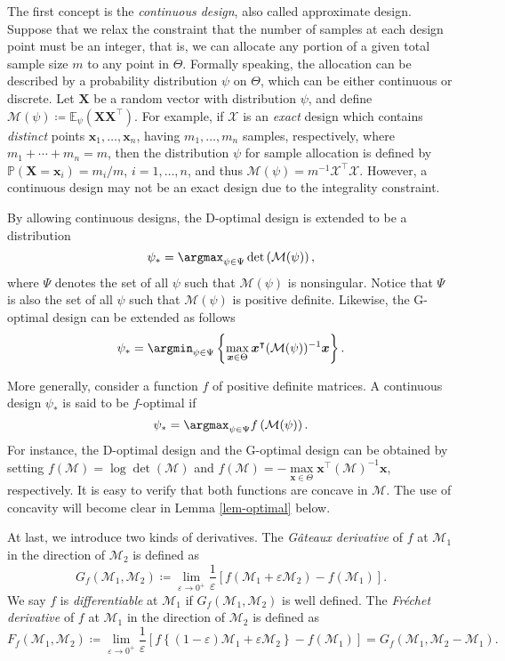 \documentclass[ijoc,nonblindrev]{informs3}
\def\E{\mathbb{E}}
\def\pr{\mathbb{P}}
\def\bx{{\bm x}}
\def\bX{{\bm X}}
\def\cX{{\mathcal X}}
\def\cM{{\mathcal M}}
\begin{document}
The first concept is the \emph{continuous design}, also called approximate design.
Suppose that we relax the constraint that the number of samples at each design point must be an integer, that is, we can allocate any portion of a given total sample size $m$  to any point in $\Theta$.
Formally speaking, the allocation can be described by a probability distribution $\psi$ on $\Theta$, which can be either continuous or discrete.
Let $\bX$ be a random vector with distribution $\psi$, and define $\cM(\psi) \coloneqq \E_\psi(\bX \bX^\intercal)$.
For example, if $\cX$ is an \emph{exact} design which contains \emph{distinct} points $\bx_1,\ldots,\bx_n$, having $m_1,\ldots,m_n$ samples, respectively, where $m_1 + \cdots + m_n=m$, then the distribution $\psi$ for sample allocation is defined by $\pr(\bX=\bx_i)= m_i / m$, $i=1,\ldots,n$, and  thus $\cM(\psi) = m^{-1} \cX^\intercal \cX$. However, a continuous design may not be an exact design due to the integrality constraint.

By allowing continuous designs, the D-optimal design is extended to be a distribution
\[\psi_* = \argmax_{\psi \in \Psi} \det \left( \cM (\psi) \right),\]
where $\Psi$ denotes the set of all $\psi$ such that $\cM (\psi)$ is nonsingular.
Notice that $\Psi$ is also the set of all $\psi$ such that $\cM (\psi)$ is positive definite.
Likewise, the G-optimal design can be extended as follows
\[\psi_* = \argmin_{\psi \in \Psi} \left\{ \max_{\bx \in \Theta} \bx^\intercal (\cM(\psi))^{-1} \bx \right\}.\]

More generally, consider a function $f$ of positive definite matrices.
A continuous design $\psi_*$ is said to be $f$-optimal if
\[\psi_* = \argmax_{\psi \in \Psi} f\left( \cM (\psi) \right).\]
For instance, the D-optimal design and the G-optimal design can be obtained by setting $f(\cM) = \log \det \left( \cM \right)$ and $f(\cM ) = - \max\limits_{\bx \in \Theta} \bx^\intercal (\cM )^{-1} \bx $, respectively.
It is easy to verify that both functions are concave in $\cM$.
The use of concavity will become clear in Lemma \ref{lem-optimal} below.




At last, we introduce two kinds of derivatives. The \emph{G\^{a}teaux derivative} of $f$ at $\cM_1$ in the direction of $\cM_2$ is defined as
$$G_f(\cM_1,\cM_2) \coloneqq \lim_{\varepsilon \to  0^+} \frac{1}{\varepsilon} \left[ f(\cM_1 + \varepsilon \cM_2) - f(\cM_1) \right].$$
We say $f$ is \emph{differentiable} at $\cM_1$ if $G_f(\cM_1,\cM_2)$ is well defined.
The \emph{Fr\'{e}chet derivative} of $f$ at $\cM_1$ in the direction of $\cM_2$ is defined as
$$F_f(\cM_1,\cM_2) \coloneqq \lim_{\varepsilon \to  0^+} \frac{1}{\varepsilon} \left[ f\left\{(1-\varepsilon) \cM_1 + \varepsilon \cM_2 \right\} - f(\cM_1) \right]
= G_f(\cM_1,\cM_2-\cM_1).$$
\end{document}
